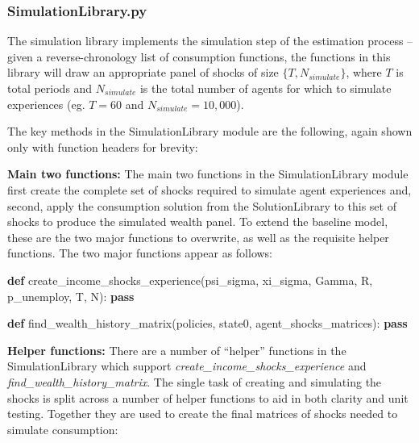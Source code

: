 \documentclass[]{article}
\newenvironment{Shaded}{}{}
\newcommand{\KeywordTok}[1]{\textcolor[rgb]{0.00,0.44,0.13}{\textbf{{#1}}}}
\newcommand{\NormalTok}[1]{{#1}}
\begin{document}
\subsubsection{SimulationLibrary.py}\label{simulationlibrary.py}

The simulation library implements the simulation step of the estimation
process -- given a reverse-chronology list of consumption functions, the
functions in this library will draw an appropriate panel of shocks of
size $\{T, N_{simulate}\}$, where $T$ is total periods and
$N_{simulate}$ is the total number of agents for which to simulate
experiences (eg. $T=60$ and $N_{simulate}=10,000$).

The key methods in the SimulationLibrary module are the following, again
shown only with function headers for brevity:

\textbf{Main two functions:} The main two functions in the
SimulationLibrary module first create the complete set of shocks
required to simulate agent experiences and, second, apply the
consumption solution from the SolutionLibrary to this set of shocks to
produce the simulated wealth panel. To extend the baseline model, these
are the two major functions to overwrite, as well as the requisite
helper functions. The two major functions appear as follows:

\begin{Shaded}
\begin{Highlighting}[]
\KeywordTok{def} \NormalTok{create_income_shocks_experience(psi_sigma, xi_sigma, Gamma, R, p_unemploy, T, N):}
    \KeywordTok{pass}

\KeywordTok{def} \NormalTok{find_wealth_history_matrix(policies, state0, agent_shocks_matrices):}
    \KeywordTok{pass}
\end{Highlighting}
\end{Shaded}

\textbf{Helper functions:} There are a number of ``helper'' functions in
the SimulationLibrary which support
\emph{create\_income\_shocks\_experience} and
\emph{find\_wealth\_history\_matrix}. The single task of creating and
simulating the shocks is split across a number of helper functions to
aid in both clarity and unit testing. Together they are used to create
the final matrices of shocks needed to simulate consumption:
\end{document}

